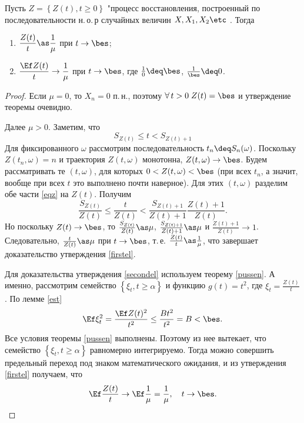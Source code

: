 \begin{theorem}
	Пусть $Z = \left\{ Z(t), t\ge 0 \right\}$ "\td процесс восстановления, построенный по последовательности н.\,о.\,р случайных величин $X, X_1, X_2\etc$ .
Тогда
	\begin{enumerate}
		\item\label{firstel} $\displaystyle \frac{Z(t)}{t} \as \frac{1}{\mu}$ при $t \to \bes$;
		\item\label{secondel} $\displaystyle \frac{\Ef Z(t)}{t} \to \frac{1}{\mu}$ при $t \to \bes$, где $\frac{1}{0} \deq \bes$, $\frac{1}{\bes} \deq 0$.
	\end{enumerate}
\end{theorem}

\begin{proof}
	Если $\mu = 0$, то $X_n = 0$ п.\,н., поэтому $\forall\, t > 0 \; Z(t) = \bes$ и утверждение теоремы очевидно.

	Далее $\mu > 0$.
Заметим, что
	$$
		S_{Z(t)} \le t < S_{Z(t) + 1}
		\label{eqz}
	$$
	Для фиксированного $\omega$ рассмотрим последовательность $t_n \deq S_n(\omega)$.
Поскольку $Z(t_n, \omega) = n$ и траектория $Z(t, \omega)$ монотонна, $Z(t, \omega) \to \bes$.
Будем рассматривать те $(t, \omega)$, для которых $0 < Z(t, \omega) < \bes$ (при всех $t_n$, а значит, вообще при всех $t$ это выполнено почти наверное).
Для этих $(t, \omega)$ разделим обе части \ref{eqz} на $Z(t)$.
Получим
	$$
		\frac{S_{Z(t)}}{Z(t)} \le \frac{t}{Z(t)} < \frac{S_{Z(t) + 1}}{Z(t) + 1}\frac{Z(t) + 1}{Z(t)}.
	$$
	Но поскольку $Z(t) \to \bes$, то $\frac{S_{Z(t)}}{Z(t)} \as \mu$, $\frac{S_{Z(t) + 1}}{Z(t) + 1} \as \mu$ и $\frac{Z(t) + 1}{Z(t)} \to 1$.
Следовательно, $\frac{t}{Z(t)} \as \mu$ при $t \to \bes$, т.\,е.
$\frac{Z(t)}{t} \as \frac{1}{\mu}$, что завершает доказательство утверждения \ref{firstel}.

	Для доказательства утверждения \ref{secondel} используем теорему \ref{pussen}.
А именно, рассмотрим семейство $\left\{\xi_t, t \ge \alpha\right\}$ и функцию $g(t) = t^2$, где $\xi_t = \frac{Z(t)}{t}$.
По лемме \ref{est}
	$$
		\Ef \xi_t^2 = \frac{\Ef Z(t)^2}{t^2} \le \frac{B t^2}{t^2} = B < \bes.
	$$
	Все условия теоремы \ref{pussen} выполнены.
Поэтому из нее вытекает, что семейство $\left\{\xi_t, t \ge \alpha\right\}$ равномерно интегрируемо.
Тогда можно совершить предельный переход под знаком математического ожидания, и из утверждения \ref{firstel} получаем, что
	$$
		\Ef \frac{Z(t)}{t} \to \Ef \frac{1}{\mu} = \frac{1}{\mu},\quad t \to \bes.
	$$
\end{proof}


